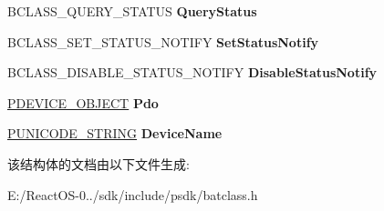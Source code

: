 \begin{DoxyCompactItemize}
\item 
\mbox{\label{struct___b_a_t_t_e_r_y___m_i_n_i_p_o_r_t___i_n_f_o_adb07c661d6b25062bb29ab98364cdf18}} 
B\+C\+L\+A\+S\+S\+\_\+\+Q\+U\+E\+R\+Y\+\_\+\+S\+T\+A\+T\+US {\bfseries Query\+Status}
\item 
\mbox{\label{struct___b_a_t_t_e_r_y___m_i_n_i_p_o_r_t___i_n_f_o_a64e9d32e01fc8a07a20586e7ef7e70e9}} 
B\+C\+L\+A\+S\+S\+\_\+\+S\+E\+T\+\_\+\+S\+T\+A\+T\+U\+S\+\_\+\+N\+O\+T\+I\+FY {\bfseries Set\+Status\+Notify}
\item 
\mbox{\label{struct___b_a_t_t_e_r_y___m_i_n_i_p_o_r_t___i_n_f_o_ad6871234d1a3114a0ecab116af8634ce}} 
B\+C\+L\+A\+S\+S\+\_\+\+D\+I\+S\+A\+B\+L\+E\+\_\+\+S\+T\+A\+T\+U\+S\+\_\+\+N\+O\+T\+I\+FY {\bfseries Disable\+Status\+Notify}
\item 
\mbox{\label{struct___b_a_t_t_e_r_y___m_i_n_i_p_o_r_t___i_n_f_o_a355e17f840b9b2e997367d52c5ffbd32}} 
\hyperlink{struct___d_e_v_i_c_e___o_b_j_e_c_t}{P\+D\+E\+V\+I\+C\+E\+\_\+\+O\+B\+J\+E\+CT} {\bfseries Pdo}
\item 
\mbox{\label{struct___b_a_t_t_e_r_y___m_i_n_i_p_o_r_t___i_n_f_o_ad5f06fd5abe322e530ced6b5b074c124}} 
\hyperlink{struct___u_n_i_c_o_d_e___s_t_r_i_n_g}{P\+U\+N\+I\+C\+O\+D\+E\+\_\+\+S\+T\+R\+I\+NG} {\bfseries Device\+Name}
\end{DoxyCompactItemize}


该结构体的文档由以下文件生成\+:\begin{DoxyCompactItemize}
\item 
E\+:/\+React\+O\+S-\/0../sdk/include/psdk/batclass.\+h\end{DoxyCompactItemize}
